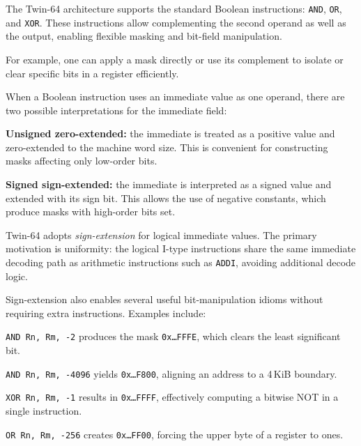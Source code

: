 
The Twin-64 architecture supports the standard Boolean instructions: \texttt{AND}, \texttt{OR}, and \texttt{XOR}. These instructions allow complementing the second operand as well as the output, enabling flexible  masking and bit-field manipulation.

For example, one can apply a mask directly or use its complement to isolate or clear specific bits in a register efficiently.

When a Boolean instruction uses an immediate value as one operand, there are two possible interpretations for the immediate field:

\begin{smallGapItemize}
    \item \textbf{Unsigned zero-extended:} the immediate is treated as a positive value and zero-extended to the machine word size. This is convenient for constructing masks affecting only low-order bits.
    \item \textbf{Signed sign-extended:} the immediate is interpreted as a signed value and extended with its sign bit. This allows the use of negative constants, which produce masks with high-order bits set.
\end{smallGapItemize}

Twin-64 adopts \emph{sign-extension} for logical immediate values. The primary motivation is uniformity: the logical I-type instructions share the same immediate decoding path as arithmetic instructions such as \texttt{ADDI}, avoiding additional decode logic.  

Sign-extension also enables several useful bit-manipulation idioms without requiring extra instructions. Examples include:

\begin{smallGapItemize}
    \item \texttt{AND Rn, Rm, -2} produces the mask \texttt{0x\ldots FFFE}, 
          which clears the least significant bit.
    \item \texttt{AND Rn, Rm, -4096} yields \texttt{0x\ldots F800}, aligning 
          an address to a 4\,KiB boundary.
    \item \texttt{XOR Rn, Rm, -1} results in \texttt{0x\ldots FFFF}, effectively 
          computing a bitwise NOT in a single instruction.
    \item \texttt{OR Rn, Rm, -256} creates \texttt{0x\ldots FF00}, forcing 
          the upper byte of a register to ones.
\end{smallGapItemize}

